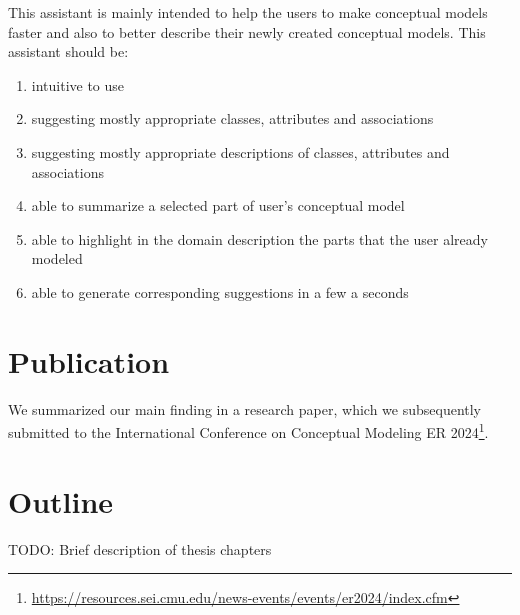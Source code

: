 This assistant is mainly intended to help the users to make conceptual models faster and also to better describe their newly created conceptual models. This assistant should be:
\begin{enumerate}
\item intuitive to use
\item suggesting mostly appropriate classes, attributes and associations
\item suggesting mostly appropriate descriptions of classes, attributes and associations
\item able to summarize a selected part of user's conceptual model
\item able to highlight in the domain description the parts that the user already modeled
\item able to generate corresponding suggestions in a few a seconds
\end{enumerate}


\section*{Publication}
We summarized our main finding in a research paper, which we subsequently submitted to the International Conference on Conceptual Modeling ER 2024\footnote{\url{https://resources.sei.cmu.edu/news-events/events/er2024/index.cfm}}.


\section*{Outline}
TODO: Brief description of thesis chapters